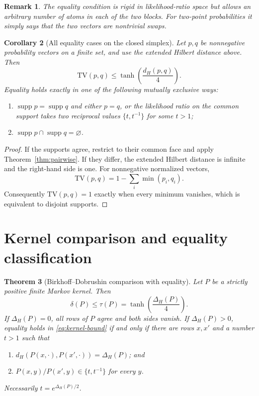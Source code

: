 \documentclass[11pt]{article}
\newtheorem{theorem}{Theorem}[section]
\newtheorem{corollary}[theorem]{Corollary}
\newtheorem{remark}[theorem]{Remark}
\newcommand{\TV}{\mathrm{TV}}
\newcommand{\diamH}{\Delta_{H}}
\newcommand{\1}{\mathbf{1}}
\begin{document}
\begin{remark}
The equality condition is rigid in likelihood-ratio space but allows an
arbitrary number of atoms in each of the two blocks.  For two-point
probabilities it simply says that the two vectors are nontrivial swaps.
\end{remark}

\begin{corollary}[All equality cases on the closed simplex]
\label{cor:closed-simplex}
Let $p,q$ be nonnegative probability vectors on a finite set, and use the
extended Hilbert distance above.  Then
\[
 \TV(p,q)\leq\tanh\!\left(\frac{d_H(p,q)}4\right).
\]
Equality holds exactly in one of the following mutually exclusive ways:
\begin{enumerate}[label=(\alph*)]
\item $\operatorname{supp}p=\operatorname{supp}q$ and either $p=q$, or the likelihood ratio on the
common support takes two reciprocal values $\{t,t^{-1}\}$ for some $t>1$;
\item $\operatorname{supp}p\cap\operatorname{supp}q=\varnothing$.
\end{enumerate}
\end{corollary}

\begin{proof}
If the supports agree, restrict to their common face and apply
Theorem~\ref{thm:pairwise}.  If they differ, the extended Hilbert distance is
infinite and the right-hand side is one.  For nonnegative normalized vectors,
\[
 \TV(p,q)=1-\sum_i\min(p_i,q_i).
\]
Consequently $\TV(p,q)=1$ exactly when every minimum vanishes, which is
equivalent to disjoint supports.
\end{proof}

\section{Kernel comparison and equality classification}

\begin{theorem}[Birkhoff--Dobrushin comparison with equality]
\label{thm:kernel-equality}
Let $P$ be a strictly positive finite Markov kernel.  Then
\begin{equation}\label{eq:kernel-bound}
 \delta(P)\leq \tau(P)=
 \tanh\!\left(\frac{\diamH(P)}4\right).
\end{equation}
If $\diamH(P)=0$, all rows of $P$ agree and both sides vanish.  If
$\diamH(P)>0$, equality holds in \eqref{eq:kernel-bound} if and only if there
are rows $x,x'$ and a number $t>1$ such that
\begin{enumerate}[label=(\alph*)]
\item $d_H(P(x,\cdot),P(x',\cdot))=\diamH(P)$; and
\item $P(x,y)/P(x',y)\in\{t,t^{-1}\}$ for every $y$.
\end{enumerate}
Necessarily $t=e^{\diamH(P)/2}$.
\end{theorem}
\end{document}
